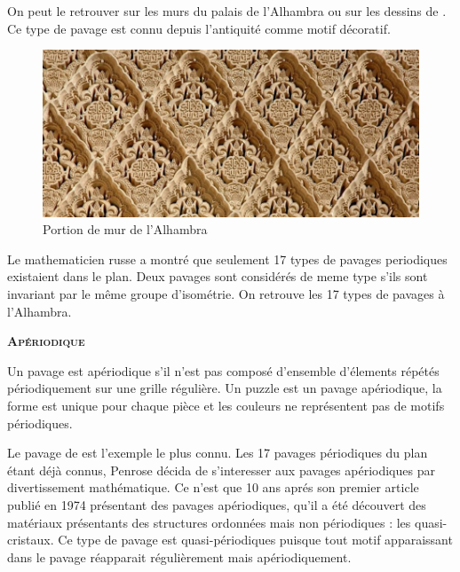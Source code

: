 \documentclass{article}
\begin{document}
On peut le retrouver sur les murs du palais de l'Alhambra ou sur les dessins de .
Ce type de pavage est connu depuis l’antiquité comme motif décoratif.

\begin{figure} [h]
    \center
    \includegraphics [scale=0.3] {image/Alhambra.jpg}
    \caption{Portion de mur de l'Alhambra}
\end{figure}

Le mathematicien russe  a montré que seulement 17 types de pavages periodiques existaient dans le plan.
Deux pavages sont considérés de meme type s’ils sont invariant par le même groupe d’isométrie.
On retrouve les 17 types de pavages à l'Alhambra.

\newpage

\hspace{1.5cm}

\textbf{\textsc{Apériodique}}

Un pavage est apériodique s'il n'est pas composé d'ensemble d'élements répétés périodiquement sur une grille régulière. Un puzzle est un pavage apériodique, la forme est unique pour chaque pièce et les couleurs ne représentent pas de motifs périodiques.

\hspace{1cm}

Le pavage de  est l'exemple le plus connu.
Les 17 pavages périodiques du plan étant déjà connus, Penrose décida de s'interesser aux pavages apériodiques par divertissement mathématique. Ce n'est que 10 ans aprés son premier article publié en 1974 présentant des pavages apériodiques, qu'il a été découvert des matériaux présentants des structures ordonnées mais non périodiques : les quasi-cristaux.
Ce type de pavage est quasi-périodiques puisque tout motif apparaissant dans le pavage réapparait régulièrement mais apériodiquement.

\hspace{1.5cm}
\end{document}
